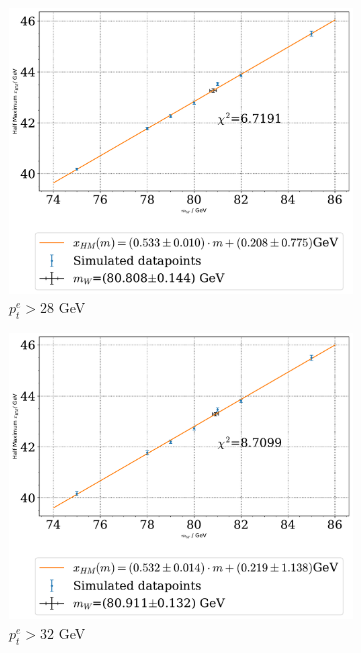 \documentclass[11pt,a4paper,notitlepage]{scrartcl}
\begin{document}
\begin{figure}[H]
	\begin{subfigure}{0.49\linewidth}
		\includegraphics[width=\linewidth]{P1_pics/gauge_results/gauge_pt_ll.pdf}
		\caption{$p_t^e>28$ GeV}
	\end{subfigure}
	\begin{subfigure}{0.49\linewidth}
		\includegraphics[width=\linewidth]{P1_pics/gauge_results/gauge_pt_ul.pdf}
		\caption{$p_t^e>32$ GeV}
	\end{subfigure}
	\begin{subfigure}{0.49\linewidth}

\end{subfigure}
\end{figure}
\end{document}
